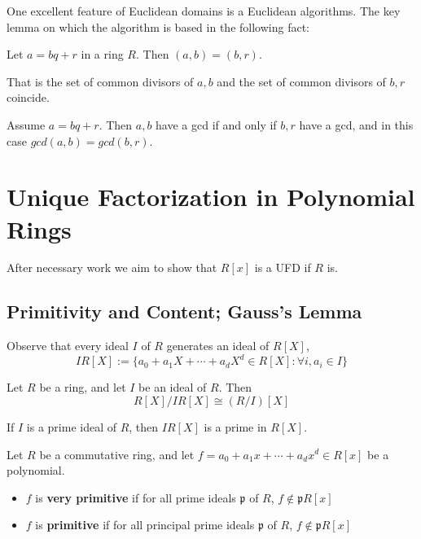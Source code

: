 \documentclass[12pt, a4paper, oneside, openright, titlepage]{book}
\begin{document}
One excellent feature of Euclidean domains is a Euclidean algorithms. The key lemma on which the algorithm is based in the following fact: 

\begin{lem}
    Let $a = bq+r$ in a ring $R$. Then $(a,b) = (b,r)$.
\end{lem}

That is the set of common divisors of $a,b$ and the set of common divisors of $b,r$ coincide.

\begin{cor}
    Assume $a  =bq+r$. Then $a,b$ have a gcd if and only if $b,r$ have a gcd, and in this case $gcd(a,b) = gcd(b,r)$.
\end{cor}


\chapter{Unique Factorization in Polynomial Rings}

After necessary work we aim to show that $R[x]$ is a UFD if $R$ is.


\section{Primitivity and Content; Gauss's Lemma}

Observe that every ideal $I$ of $R$ generates an ideal of $R[X]$, \begin{equation*}
    IR[X] := \{a_0+a_1X+\cdots+a_dX^d \in R[X]:\forall i,a_i \in I\}
\end{equation*}

\begin{lem}
    Let $R$ be a ring, and let $I$ be an ideal of $R$. Then \begin{equation*}
        R[X]/IR[X] \cong (R/I)[X]
    \end{equation*}
\end{lem}

\begin{cor}
    If $I$ is a prime ideal of $R$, then $IR[X]$ is a prime in $R[X]$.
\end{cor}

\begin{defn}
    Let $R$ be a commutative ring, and let $f = a_0+a_1x+\cdots+a_dx^d \in R[x]$ be a polynomial. \begin{itemize}
        \item $f$ is \textbf{very primitive} if for all prime ideals $\mathfrak{p}$ of $R$, $f \notin \mathfrak{p}R[x]$
        \item $f$ is \textbf{primitive} if for all principal prime ideals $\mathfrak{p}$ of $R$, $f \notin \mathfrak{p}R[x]$
    \end{itemize}
\end{defn}
\end{document}
